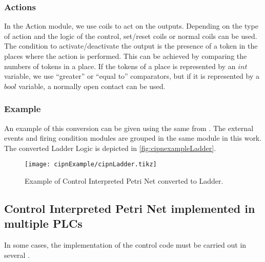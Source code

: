 \subsubsection{Actions}
In the Action module, we use coils to act on the outputs. Depending on the type
of action and the logic of the control, set\slash reset coils or normal coils
can be used. The condition to activate\slash deactivate the output is the
presence of a token in the places where the action is performed.
This can be
achieved by comparing the numbers of tokens in a place. If the tokens of a
place is represented by an $int$ variable, we use ``greater'' or ``equal to'' comparators,
but if it is represented by a $bool$ variable, a normally open contact can be
used.
\subsubsection{Example}
An example of this conversion can be given using the same \CIPN{} from 
.  The external events and firing condition
modules are grouped in the same module in this work. The converted Ladder Logic
is depicted in \autoref{fig:cipnexampleLadder}.
\begin{figure}[H]
  \centering \texttt{[image: cipnExample/cipnLadder.tikz]}
  \caption{Example of Control Interpreted Petri Net converted to
    Ladder.}
  \label{fig:cipnexampleLadder}
\end{figure}

\subsection{Control Interpreted Petri Net implemented in multiple PLCs}
\label{sec:multiplePlcs}
In some cases, the implementation of the control code must be carried out in
several \PLCs.

